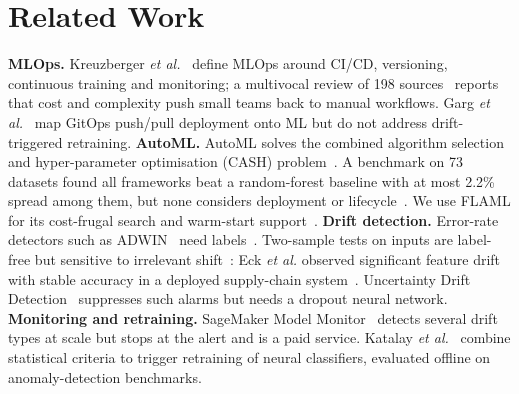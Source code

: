 \documentclass[conference]{IEEEtran}
\begin{document}
\section{Related Work}
\textbf{MLOps.} Kreuzberger \emph{et al.}~\cite{kreuzberger2023} define MLOps around CI/CD, versioning, continuous training and monitoring; a multivocal review of 198 sources~\cite{eken2024} reports that cost and complexity push small teams back to manual workflows. Garg \emph{et al.}~\cite{garg2021} map GitOps push/pull deployment onto ML but do not address drift-triggered retraining.
\textbf{AutoML.} AutoML solves the combined algorithm selection and hyper-parameter optimisation (CASH) problem~\cite{he2021}. A benchmark on 73 datasets found all frameworks beat a random-forest baseline with at most 2.2\% spread among them, but none considers deployment or lifecycle~\cite{zoller2021}. We use FLAML for its cost-frugal search and warm-start support~\cite{wang2021flaml}.
\textbf{Drift detection.} Error-rate detectors such as ADWIN~\cite{bifet2007} need labels~\cite{gama2014}. Two-sample tests on inputs are label-free but sensitive to irrelevant shift~\cite{rabanser2019}: Eck \emph{et al.} observed significant feature drift with stable accuracy in a deployed supply-chain system~\cite{eck2022}. Uncertainty Drift Detection~\cite{baier2021} suppresses such alarms but needs a dropout neural network.
\textbf{Monitoring and retraining.} SageMaker Model Monitor~\cite{nigenda2022} detects several drift types at scale but stops at the alert and is a paid service. Katalay \emph{et al.}~\cite{katalay2025} combine statistical criteria to trigger retraining of neural classifiers, evaluated offline on anomaly-detection benchmarks.
\end{document}

